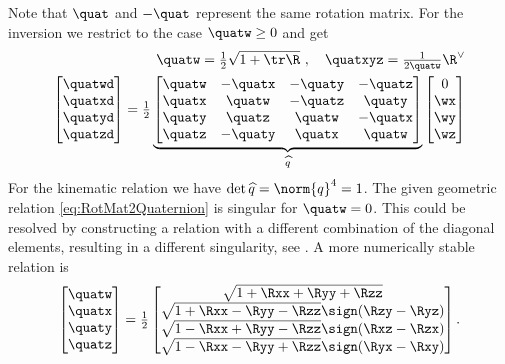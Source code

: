 Note that $\quat$ and $-\quat$ represent the same rotation matrix.
For the inversion we restrict to the case $\quatw \geq 0$ and get
\begin{align}
 \quatw = \tfrac{1}{2} \sqrt{1 + \tr\R} \ ,
\quad
 \quatxyz = \tfrac{1}{2\quatw} \R^\vee
\label{eq:RotMat2Quaternion}
\\
 \begin{bmatrix} \quatwd \\ \quatxd \\ \quatyd \\ \quatzd \end{bmatrix}
 =
 \tfrac{1}{2} \underbrace{\begin{bmatrix}
  \quatw & -\quatx & -\quaty & -\quatz \\
  \quatx &  \quatw & -\quatz &  \quaty \\
  \quaty &  \quatz &  \quatw & -\quatx \\
  \quatz & -\quaty &  \quatx &  \quatw
 \end{bmatrix}}_{\widehat{q}}
 \begin{bmatrix} 0 \\ \wx \\ \wy \\ \wz \end{bmatrix}
\label{eq:AppQuaternionKinematics}
\end{align}
For the kinematic relation we have $\det \widehat{q} = \norm{q}^4 = 1$.
The given geometric relation \eqref{eq:RotMat2Quaternion} is singular for $\quatw = 0$.
This could be resolved by constructing a relation with a different combination of the diagonal elements, resulting in a different singularity, see \cite{Horn:Quaternions}.
A more numerically stable relation is
\begin{align}
 \begin{bmatrix} \quatw \\ \quatx \\ \quaty \\ \quatz \end{bmatrix}
 =
 \tfrac{1}{2}
 \begin{bmatrix}
  \sqrt{1+\Rxx+\Ryy+\Rzz} \\
  \sqrt{1+\Rxx-\Ryy-\Rzz} \sign (\Rzy-\Ryz) \\
  \sqrt{1-\Rxx+\Ryy-\Rzz} \sign (\Rxz-\Rzx) \\
  \sqrt{1-\Rxx-\Ryy+\Rzz} \sign (\Ryx-\Rxy) \\
 \end{bmatrix}
 .
\end{align}

